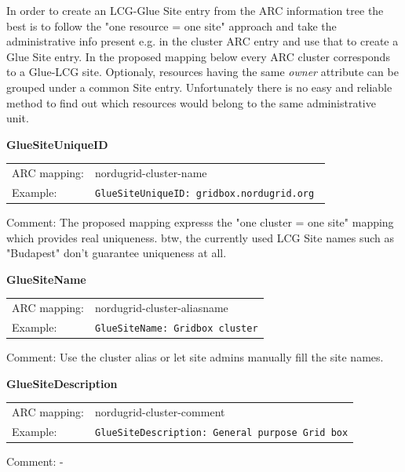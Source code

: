 \documentclass{article}
\begin{document}
In order to create an LCG-Glue Site entry from the ARC information 
tree the best is to follow  the "one resource = one site" approach and take the 
administrative info present e.g. in the cluster ARC entry and use that to 
create a Glue Site entry.
In the proposed mapping below every ARC cluster corresponds to a Glue-LCG site.
Optionaly, resources having the same {\it owner} attribute can be
grouped under a common Site entry. Unfortunately there is no easy 
and reliable method to find out which resources would belong to the same 
administrative unit.


\hspace*{0.5cm}
\begin{shaded}
 \textbf{GlueSiteUniqueID} 
\end{shaded}
\begin{tabular}{lp{10cm}}  
  ARC mapping:& nordugrid-cluster-name\\
  Example:& \verb#GlueSiteUniqueID: gridbox.nordugrid.org #\\
\end{tabular}

Comment: The proposed mapping expresss the "one cluster = one site" mapping
which provides real uniqueness. btw, the currently used  LCG Site names such as
"Budapest" don't guarantee uniqueness at all.


\hspace*{0.5cm}
\begin{shaded}
 \textbf{GlueSiteName} 
\end{shaded}
\begin{tabular}{lp{10cm}}  
  ARC mapping:& nordugrid-cluster-aliasname\\
  Example:& \verb#GlueSiteName: Gridbox cluster#\\
\end{tabular}

Comment: Use the cluster alias or let site admins manually fill the
site names.


\hspace*{0.5cm}
\begin{shaded}
 \textbf{GlueSiteDescription} 
\end{shaded}
\begin{tabular}{lp{10cm}}  
  ARC mapping:& nordugrid-cluster-comment\\
  Example:& \verb#GlueSiteDescription: General purpose Grid box#\\
\end{tabular}

Comment: -
\end{document}
